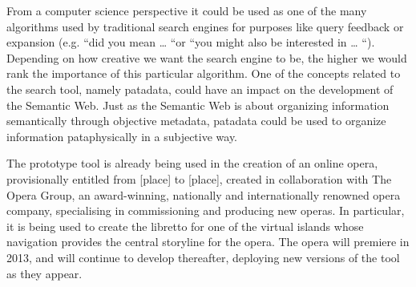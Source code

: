 \begin{draft}
  From a computer science perspective it could be used as one of the many algorithms used by traditional search engines for purposes like query feedback or expansion (e.g. “did you mean … “or “you might also be interested in … “). Depending on how creative we want the search engine to be, the higher we would rank the importance of this particular algorithm. One of the concepts related to the search tool, namely patadata, could have an impact on the development of the Semantic Web. Just as the Semantic Web is about organizing information semantically through objective metadata, patadata could be used to organize information pataphysically in a subjective way.

  The prototype tool is already being used in the creation of an online opera, provisionally entitled from [place] to [place], created in collaboration with The Opera Group, an award-winning, nationally and internationally renowned opera company, specialising in commissioning and producing new operas. In particular, it is being used to create the libretto for one of the virtual islands whose navigation provides the central storyline for the opera. The opera will premiere in 2013, and will continue to develop thereafter, deploying new versions of the tool as they appear.
\end{draft}






\stopcontents[chapters]
